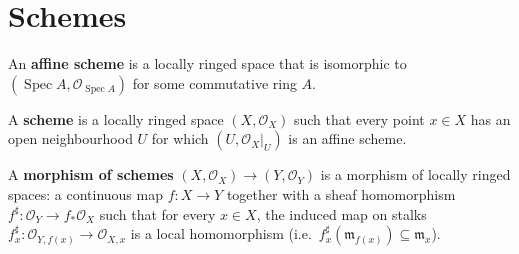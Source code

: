 \documentclass[a4paper]{article}
\begin{document}
\section{Schemes}

\begin{definition}
    \label{def:affine_scheme}
    \leanok
    An \textbf{affine scheme} is a locally ringed space that is isomorphic to $(\operatorname{Spec} A, \mathcal{O}_{\operatorname{Spec} A})$ for some commutative ring $A$.
\end{definition}

\begin{definition}[Scheme]
    \label{def:scheme}
    \leanok
    A \textbf{scheme} is a locally ringed space $(X, \mathcal{O}_X)$ such that every point $x \in X$ has an open neighbourhood $U$ for which $(U, \mathcal{O}_X|_U)$ is an affine scheme.
\end{definition}

\begin{definition}
    \label{def:morphism_of_schemes}
    \leanok
    A \textbf{morphism of schemes} $(X, \mathcal{O}_X) \to (Y, \mathcal{O}_Y)$ is a morphism of locally ringed spaces: a continuous map $f \colon X \to Y$ together with a sheaf homomorphism $f^\sharp \colon \mathcal{O}_Y \to f_*\mathcal{O}_X$ such that for every $x \in X$, the induced map on stalks $f^\sharp_x \colon \mathcal{O}_{Y,f(x)} \to \mathcal{O}_{X,x}$ is a local homomorphism (i.e.\ $f^\sharp_x(\mathfrak{m}_{f(x)}) \subseteq \mathfrak{m}_x$).
\end{definition}
\end{document}
